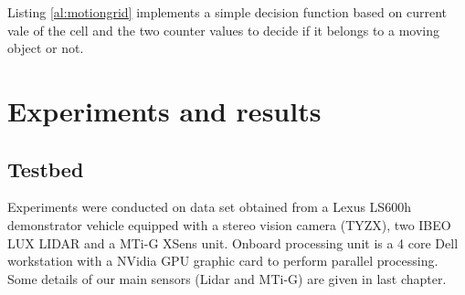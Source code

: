 Listing \ref{al:motiongrid} implements a simple decision function based on current vale of the cell and the two counter values to decide if it belongs to a moving object or not.

\section{Experiments and results}






\subsection{Testbed}
\label{sec:testbed}

Experiments were conducted on data set obtained from a Lexus LS600h demonstrator vehicle equipped with a stereo vision camera (TYZX), two IBEO LUX LIDAR and a MTi-G XSens unit. Onboard processing unit is a 4 core Dell workstation with a NVidia GPU graphic card to perform parallel processing. Some details of our main sensors (Lidar and MTi-G) are given in last chapter.


